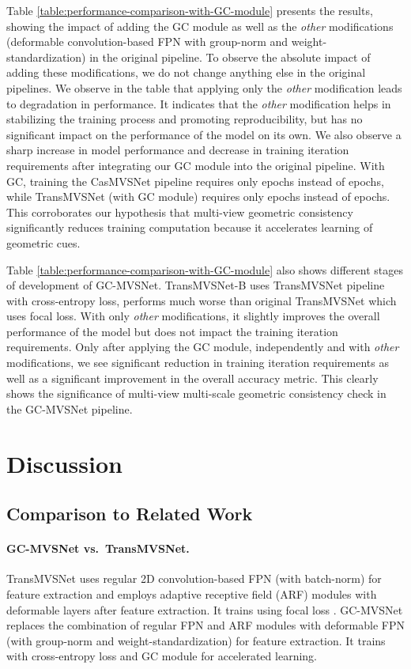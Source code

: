 \documentclass[10pt,twocolumn,letterpaper]{article}
\begin{document}
Table \ref{table:performance-comparison-with-GC-module} presents the results,
showing the impact
of adding the GC module as well as the \textit{other} modifications (deformable convolution-based FPN with group-norm and weight-standardization)
in the
original pipeline. To observe the absolute impact of adding these
modifications, we do not change anything else in the original
pipelines. We observe in the table that applying only the \textit{other}
modification leads to degradation in  performance. It
indicates that the \textit{other} modification helps in
stabilizing the training process and promoting reproducibility, but
has no significant impact on the performance of the model on its
own. We also observe a sharp increase in model
performance and decrease in training iteration requirements after integrating
our GC module into the original pipeline. With GC, training the
CasMVSNet pipeline requires only  epochs 
instead of  epochs, while TransMVSNet (with GC module) requires only  epochs
instead of  epochs. This corroborates our
hypothesis that multi-view geometric consistency significantly reduces training computation
because it accelerates learning of geometric cues.

Table \ref{table:performance-comparison-with-GC-module} also shows
different stages of development of GC-MVSNet.  TransMVSNet-B uses TransMVSNet pipeline with cross-entropy loss, performs much worse than original TransMVSNet
\cite{ding2022transmvsnet} which uses focal loss. With only \textit{other} 
modifications, it slightly improves the overall performance of the model but does not
  impact the training iteration requirements. Only after applying the GC module,
  independently and with \textit{other} modifications, we see significant reduction
  in training iteration requirements as well as a significant improvement in the overall
  accuracy metric. This clearly shows the significance of multi-view multi-scale geometric consistency check in the GC-MVSNet pipeline.

\vspace{-8pt}
\section{Discussion}
\subsection{Comparison to Related Work}\label{sec:model_comparison}

\paragraph{GC-MVSNet vs.~TransMVSNet.}
TransMVSNet \cite{ding2022transmvsnet} uses regular 2D
convolution-based FPN (with batch-norm) for feature extraction and
employs adaptive receptive field (ARF) modules with deformable layers
after feature extraction. It trains using focal loss
\cite{Lin2017FocalLoss}. GC-MVSNet replaces the combination of regular
FPN and ARF modules with deformable FPN (with group-norm and
weight-standardization) for feature extraction. It trains with cross-entropy  
loss
and GC module for accelerated learning.
\end{document}
